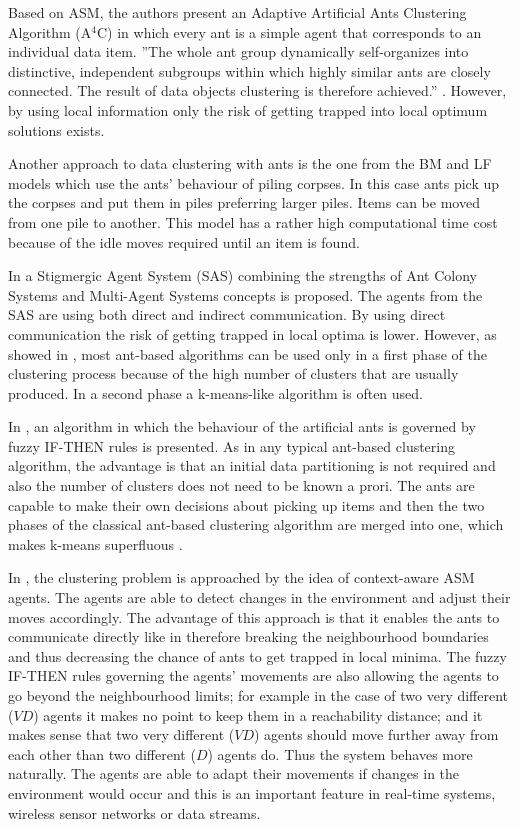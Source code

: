 Based on ASM, the authors present an Adaptive Artificial Ants Clustering Algorithm (A$^{4}$C) \cite{Chen04AnAdaptive} in which every ant is a simple agent that corresponds to an individual data item. ''The whole ant group dynamically self-organizes into distinctive, independent subgroups within which highly similar ants are closely connected. The result of data objects clustering is therefore achieved.'' \cite{Chen04AnAdaptive}. However, by using local information only the risk of getting trapped into local optimum solutions exists.

Another approach to data clustering with ants is the one from the BM \cite{Deneubourg91TheDynamic} and LF \cite{Lumer94Diversity} models which use the ants' behaviour of piling corpses. In this case ants pick up the corpses and put them in piles preferring larger piles. Items can be moved from one pile to another. This model has a  rather high computational time cost because of the idle moves required until an item is found. 

In \cite{Chira07Stigmergic} a Stigmergic Agent System (SAS) combining the strengths of Ant Colony Systems and Multi-Agent Systems concepts is proposed. The agents from the SAS are using both direct and indirect communication. By using direct communication the risk of getting trapped in local optima is lower. However, as showed in \cite{Schockaert04Fuzzy}, most ant-based algorithms can be used only in a first phase of the clustering process because of the high number of clusters that are usually produced. In a second phase a k-means-like algorithm is often used. 

In \cite{Schockaert04Fuzzy}, an algorithm in which the behaviour of the artificial ants is governed by fuzzy IF-THEN rules is presented. 
As in any typical ant-based clustering algorithm, the advantage is that an initial data partitioning is not required and also the number of clusters does not need to be known a prori.
The ants are capable to make their own decisions about picking up items and then the two phases of the classical ant-based clustering algorithm are merged into one, which makes k-means superfluous \cite{Schockaert04Fuzzy}.

In \cite{Gaceanu11AContext}, the clustering problem is approached by the idea of context-aware ASM agents. The agents are able to detect changes in the environment and adjust their moves accordingly. The advantage of this approach is that it enables the  ants to communicate directly like in \cite{Chira07Stigmergic} therefore breaking the neighbourhood boundaries and thus decreasing the chance of ants to get trapped in local minima. The fuzzy IF-THEN rules governing the agents' movements are also allowing the agents to go beyond the neighbourhood limits; for example in the case of two very different ($VD$) agents it makes no point to keep them in a reachability distance; and it makes sense that two very different ($VD$) agents should move further away from each other than two different ($D$) agents do. Thus the system behaves more naturally. The agents are able to adapt their movements if changes in the environment would occur and this is an important feature in real-time systems, wireless sensor networks or data streams.

